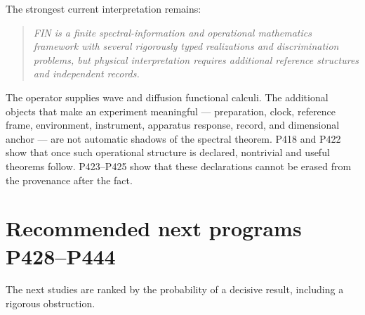 \documentclass[11pt,a4paper,openany]{report}
\begin{document}
The strongest current interpretation remains:

\begin{quote}\itshape
FIN is a finite spectral-information and operational mathematics framework with several rigorously typed realizations and discrimination problems, but physical interpretation requires additional reference structures and independent records.

\end{quote}

The operator supplies wave and diffusion functional calculi. The additional objects that make an experiment meaningful --- preparation, clock, reference frame, environment, instrument, apparatus response, record, and dimensional anchor --- are not automatic shadows of the spectral theorem. P418 and P422 show that once such operational structure is declared, nontrivial and useful theorems follow. P423--P425 show that these declarations cannot be erased from the provenance after the fact.

\chapter{Recommended next programs P428--P444}

The next studies are ranked by the probability of a decisive result, including a rigorous obstruction.
\end{document}
